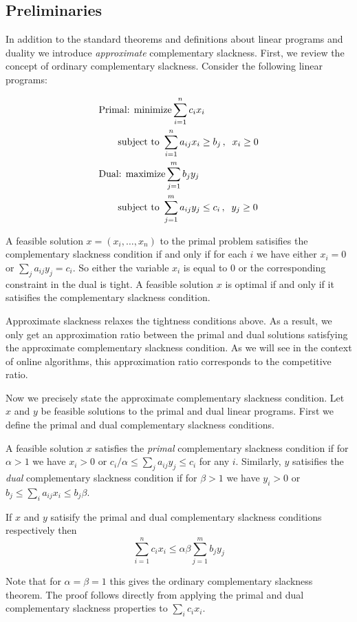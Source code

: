\subsection{Preliminaries}
In addition to the standard theorems and definitions about linear programs and duality we introduce \emph{approximate} complementary slackness.
First, we review the concept of ordinary complementary slackness.
Consider the following linear programs:

\vspace{-.5cm}
\begin{align*}
& \textnormal{Primal: } \textnormal{minimize} \sum_{i=1}^n c_i x_i \\
 &\qquad \textnormal{subject to } \sum_{i=1}^n a_{ij} x_i  \geq b_j \, , \;\; x_i \geq 0 \\
& \textnormal{Dual: } \textnormal{maximize} \sum_{j=1}^m b_j y_j \\
 &\qquad \textnormal{subject to } \sum_{j=1}^m a_{ij} y_j \leq c_i \, , \;\; y_j \geq 0
\end{align*}
\vspace{-.5cm}

A feasible solution $x = (x_i, \ldots, x_n)$ to the primal problem satisifies the complementary slackness condition if and only if for each $i$ we have either $x_i = 0$ or $\sum_{j} a_{ij}y_j = c_i$.
So either the variable $x_i$ is equal to 0 or the corresponding constraint in the dual is tight.
A feasible solution $x$ is optimal if and only if it satisifies the complementary slackness condition.

Approximate slackness relaxes the tightness conditions above.
As a result, we only get an approximation ratio between the primal and dual solutions satisfying the approximate complementary slackness condition.
As we will see in the context of online algorithms, this approximation ratio corresponds to the competitive ratio.

Now we precisely state the approximate complementary slackness condition.
Let $x$ and $y$ be feasible solutions to the primal and dual linear programs.
First we define the primal and dual complementary slackness conditions.

A feasible solution $x$ satisfies the \emph{primal} complementary slackness condition if for $\alpha > 1$ we have $x_i > 0$ or $c_i / \alpha \leq \sum_j a_{ij} y_j \leq c_i$ for any $i$.
Similarly, $y$ satisifies the \emph{dual} complementary slackness condition if for $\beta > 1$ we have $y_i > 0$ or $b_j \leq \sum_i a_{ij} x_i \leq b_j \beta$.

If $x$ and $y$ satisify the primal and dual complementary slackness conditions respectively then 
\[
\sum_{i=1}^n c_i x_i  \leq \alpha \beta  \sum_{j=1}^m b_j y_j
\]

Note that for $\alpha = \beta = 1$ this gives the ordinary complementary slackness theorem.
The proof follows directly from applying the primal and dual complementary slackness properties to $\sum_i c_i x_i$.

